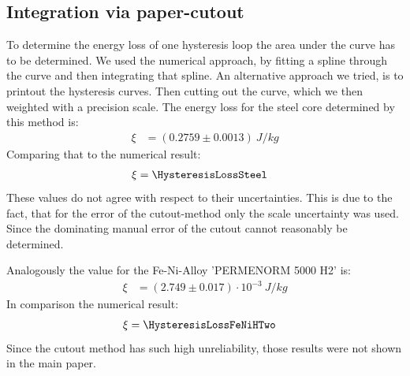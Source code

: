 \documentclass[a4paper,10pt,twocolumn]{article}
\begin{document}
    \subsection{Integration via paper-cutout}
    \label{subsec:ManualIntegration}
    
    To determine the energy loss of one hysteresis loop the area under the curve has to be determined.
    We used the numerical approach, by fitting a spline through the curve and then integrating that spline.
    An alternative approach we tried, is to printout the hysteresis curves.
    Then cutting out the curve, which we then weighted with a precision scale.
    The energy loss for the steel core determined by this method is:
    \begin{align*}
        \xi &= (0.2759 \pm 0.0013) \ J/kg
    \end{align*}
    Comparing that to the numerical result:
    \begin{align*}
        \xi &= \HysteresisLossSteel
    \end{align*}
    These values do not agree with respect to their uncertainties.
    This is due to the fact, that for the error of the cutout-method only the scale uncertainty was used.
    Since the dominating manual error of the cutout cannot reasonably be determined.
    
    Analogously the value for the Fe-Ni-Alloy 'PERMENORM 5000 H2' is:
    \begin{align*}
        \xi &= (2.749 \pm 0.017) \cdot 10^{-3} \ J/kg
    \end{align*}
    In comparison the numerical result:
    \begin{align*}
        \xi &= \HysteresisLossFeNiHTwo
    \end{align*}
    Since the cutout method has such high unreliability, those results were not shown in the main paper.
    
    
    
\end{document}
